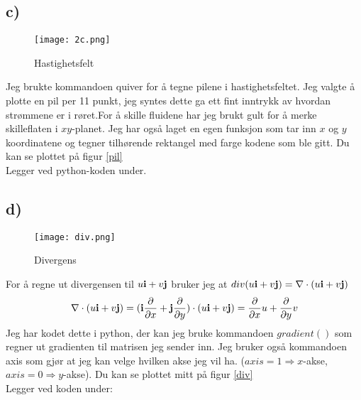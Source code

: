 \documentclass[a4paper,12pt,norsk]{article}
\begin{document}
\subsection*{c)}
\begin{figure}[h!]
\texttt{[image: 2c.png]} 
\caption{Hastighetsfelt}
\label{pil}
\end{figure} 

Jeg brukte kommandoen quiver for å tegne pilene i hastighetsfeltet. Jeg valgte å plotte en pil per 11 punkt, jeg syntes dette ga ett fint inntrykk av hvordan strømmene er i røret.For å skille fluidene har jeg brukt gult for å merke skilleflaten i $xy$-planet. Jeg har også laget en egen funksjon som tar inn $x$ og $y$ koordinatene og tegner tilhørende rektangel med farge kodene som ble gitt. Du kan se plottet på figur \vref{pil}\\ Legger ved python-koden under.


\subsection*{d)}
\begin{figure}[h!]
\texttt{[image: div.png]} 
\caption{Divergens}
\label{div}
\end{figure} 

For å regne ut divergensen til $u\bold{i} + v\bold{j}$ bruker jeg at $div(u\bold{i} + v\bold{j})= \nabla  \cdot (u\bold{i} + v\bold{j})$
\begin{align*}
\nabla  \cdot (u\bold{i} + v\bold{j}) = (\bold{i}\frac{\partial}{\partial{x}} + \bold{j}\frac{\partial}{\partial{y}}) \cdot (u\bold{i} + v\bold{j}) = \frac{\partial}{\partial{x}}u + \frac{\partial}{\partial{y}}v
\end{align*}
Jeg har kodet dette i python, der kan jeg bruke kommandoen $gradient()$ som regner ut gradienten til matrisen jeg sender inn. Jeg bruker også kommandoen axis som gjør at jeg kan velge hvilken akse jeg vil ha. ($axis=1\Rightarrow x$-akse, $axis=0 \Rightarrow y$-akse). Du kan se plottet mitt på figur \vref{div} \\
Legger ved koden under:

\end{document}

